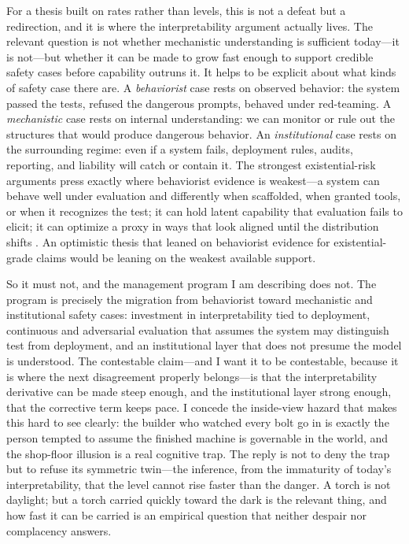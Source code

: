 \documentclass[11pt]{article}
\begin{document}
For a thesis built on rates rather than levels, this is not a defeat but a redirection, and it is where the interpretability argument actually lives. The relevant question is not whether mechanistic understanding is sufficient today---it is not---but whether it can be made to grow fast enough to support credible safety cases before capability outruns it. It helps to be explicit about what kinds of safety case there are. A \emph{behaviorist} case rests on observed behavior: the system passed the tests, refused the dangerous prompts, behaved under red-teaming. A \emph{mechanistic} case rests on internal understanding: we can monitor or rule out the structures that would produce dangerous behavior. An \emph{institutional} case rests on the surrounding regime: even if a system fails, deployment rules, audits, reporting, and liability will catch or contain it. The strongest existential-risk arguments press exactly where behaviorist evidence is weakest---a system can behave well under evaluation and differently when scaffolded, when granted tools, or when it recognizes the test; it can hold latent capability that evaluation fails to elicit; it can optimize a proxy in ways that look aligned until the distribution shifts \citep{hubinger2024}. An optimistic thesis that leaned on behaviorist evidence for existential-grade claims would be leaning on the weakest available support.

So it must not, and the management program I am describing does not. The program is precisely the migration from behaviorist toward mechanistic and institutional safety cases: investment in interpretability tied to deployment, continuous and adversarial evaluation that assumes the system may distinguish test from deployment, and an institutional layer that does not presume the model is understood. The contestable claim---and I want it to be contestable, because it is where the next disagreement properly belongs---is that the interpretability derivative can be made steep enough, and the institutional layer strong enough, that the corrective term keeps pace. I concede the inside-view hazard that makes this hard to see clearly: the builder who watched every bolt go in is exactly the person tempted to assume the finished machine is governable in the world, and the shop-floor illusion is a real cognitive trap. The reply is not to deny the trap but to refuse its symmetric twin---the inference, from the immaturity of today's interpretability, that the level cannot rise faster than the danger. A torch is not daylight; but a torch carried quickly toward the dark is the relevant thing, and how fast it can be carried is an empirical question that neither despair nor complacency answers.
\end{document}
